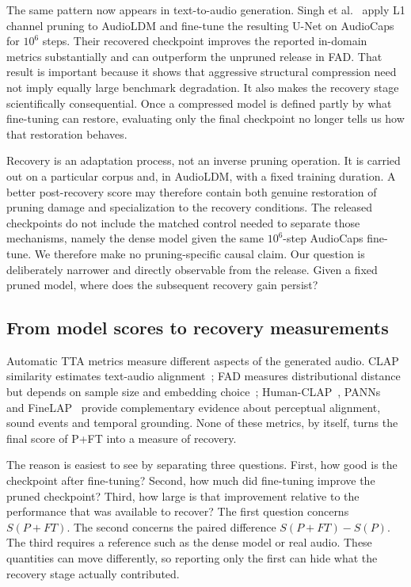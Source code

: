 \documentclass{article}
\newcommand{\PFT}{P{+}FT}
\begin{document}
The same pattern now appears in text-to-audio generation. Singh et al.~\cite{singh2026pruning} apply L1 channel pruning to AudioLDM and fine-tune the resulting U-Net on AudioCaps for $10^{6}$ steps. Their recovered checkpoint improves the reported in-domain metrics substantially and can outperform the unpruned release in FAD. That result is important because it shows that aggressive structural compression need not imply equally large benchmark degradation. It also makes the recovery stage scientifically consequential. Once a compressed model is defined partly by what fine-tuning can restore, evaluating only the final checkpoint no longer tells us how that restoration behaves.

Recovery is an adaptation process, not an inverse pruning operation. It is carried out on a particular corpus and, in AudioLDM, with a fixed training duration. A better post-recovery score may therefore contain both genuine restoration of pruning damage and specialization to the recovery conditions. The released checkpoints do not include the matched control needed to separate those mechanisms, namely the dense model given the same $10^{6}$-step AudioCaps fine-tune. We therefore make no pruning-specific causal claim. Our question is deliberately narrower and directly observable from the release. Given a fixed pruned model, where does the subsequent recovery gain persist?

\subsection{From model scores to recovery measurements}
Automatic TTA metrics measure different aspects of the generated audio. CLAP similarity estimates text-audio alignment~\cite{wu2023clap}; FAD measures distributional distance but depends on sample size and embedding choice~\cite{kilgour2019fad,gui2024fad,chung2025kad}; Human-CLAP~\cite{takano2025humanclap}, PANNs~\cite{kong2020panns} and FineLAP~\cite{li2026finelap} provide complementary evidence about perceptual alignment, sound events and temporal grounding. None of these metrics, by itself, turns the final score of \PFT{} into a measure of recovery.

The reason is easiest to see by separating three questions. First, how good is the checkpoint after fine-tuning? Second, how much did fine-tuning improve the pruned checkpoint? Third, how large is that improvement relative to the performance that was available to recover? The first question concerns $S(\PFT{})$. The second concerns the paired difference $S(\PFT{})-S(P)$. The third requires a reference such as the dense model or real audio. These quantities can move differently, so reporting only the first can hide what the recovery stage actually contributed.
\end{document}
